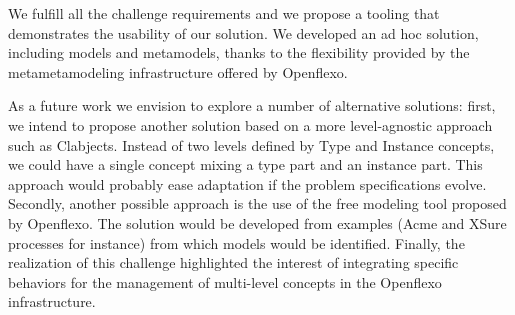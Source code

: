 

We fulfill all the challenge requirements and we propose a tooling that demonstrates the usability of our solution.  We developed an ad hoc solution, including models and metamodels, thanks to the flexibility provided by the metametamodeling infrastructure offered by Openflexo.

As a future work we envision to explore a number of alternative solutions: first, we intend to propose another solution based on a more level-agnostic approach such as Clabjects. Instead of two levels defined by Type and Instance concepts, we could have a single concept mixing a type part and an instance part. This approach would probably ease adaptation if the problem specifications evolve. Secondly, another possible approach is the use of the free modeling tool proposed by Openflexo. The solution would be developed from examples (Acme and XSure processes for instance) from which models would be identified. Finally, the realization of this challenge highlighted the interest of integrating specific behaviors for the management of multi-level concepts in the Openflexo infrastructure. %
